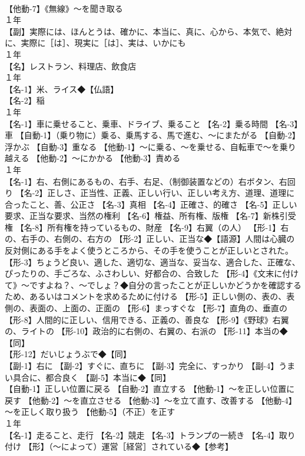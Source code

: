 \documentclass[8pt]{extreport}
\begin{document}
\begin{CJK}{UTF8}{min}
\\	【他動-7】《無線》～を聞き取る
\\	１年	
\\	【副】実際には、ほんとうは、確かに、本当に、真に、心から、本気で、絶対に、実際に［は］、現実に［は］、実は、いかにも
\\	１年	
\\	【名】レストラン、料理店、飲食店
\\	１年	
\\	【名-1】米、ライス◆【仏語】
\\	【名-2】稲
\\	１年	
\\	【名-1】車に乗せること、乗車、ドライブ、乗ること 【名-2】乗る時間 【名-3】車 【自動-1】（乗り物に）乗る、乗馬する、馬で進む、～にまたがる 【自動-2】浮かぶ 【自動-3】重なる 【他動-1】～に乗る、～を乗せる、自転車で～を乗り越える 【他動-2】～にかかる 【他動-3】責める
\\	１年	
\\	【名-1】右、右側にあるもの、右手、右足、（制御装置などの）右ボタン、右回り 【名-2】正しさ、正当性、正義、正しい行い、正しい考え方、道理、道理に合ったこと、善、公正さ 【名-3】真相 【名-4】正確さ、的確さ 【名-5】正しい要求、正当な要求、当然の権利 【名-6】権益、所有権、版権 【名-7】新株引受権 【名-8】所有権を持っているもの、財産 【名-9】右翼（の人） 【形-1】右の、右手の、右側の、右方の 【形-2】正しい、正当な◆【語源】人間は心臓の反対側にある手をよく使うところから、その手を使うことが正しいとされた。 【形-3】ちょうど良い、適した、適切な、適当な、妥当な、適合した、正確な、ぴったりの、手ごろな、ふさわしい、好都合の、合致した 【形-4】《文末に付けて》～ですよね？、～でしょ？◆自分の言ったことが正しいかどうかを確認するため、あるいはコメントを求めるために付ける 【形-5】正しい側の、表の、表側の、表面の、上面の、正面の 【形-6】まっすぐな 【形-7】直角の、垂直の 【形-8】人間的に正しい、信用できる、正義の、善良な 【形-9】《野球》右翼の、ライトの 【形-10】政治的に右側の、右翼の、右派の 【形-11】本当の◆【同】
\\	【形-12】だいじょうぶで◆【同】
\\	【副-1】右に 【副-2】すぐに、直ちに 【副-3】完全に、すっかり 【副-4】うまい具合に、都合良く 【副-5】本当に◆【同】
\\	【自動-1】正しい位置に戻る 【自動-2】直立する 【他動-1】～を正しい位置に戻す 【他動-2】～を直立させる 【他動-3】～を立て直す、改善する 【他動-4】～を正しく取り扱う 【他動-5】（不正）を正す
\\	１年	
\\	【名-1】走ること、走行 【名-2】競走 【名-3】トランプの一続き 【名-4】取り付け 【形】（～によって）運営［経営］されている◆【参考】

\end{CJK}
\end{document}

